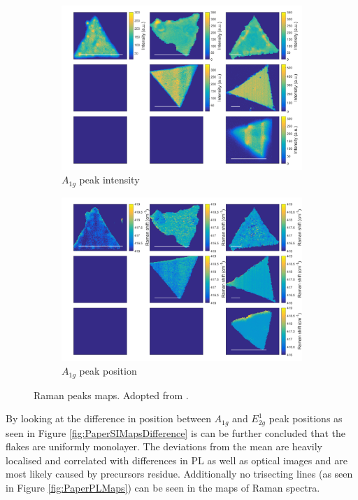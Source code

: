 \begin{figure}[h]
\begin{center}
\begin{subfigure}[b]{0.4\textwidth}
			\includegraphics[width=\textwidth]{PaperSIMapsIntensityA.png}
			\caption{$A_{1g}$ peak intensity}
			\label{fig:PaperSIMapsIntensityA}
		\end{subfigure}
		\quad
		\begin{subfigure}[b]{0.4\textwidth}
			\includegraphics[width=\textwidth]{PaperSIMapsPositionA.png}
			\caption{$A_{1g}$ peak position}
			\label{fig:PaperSIMapsPositionA}
		\end{subfigure}
		\caption{Raman peaks maps. Adopted from \cite{Reale2017}.}
		\label{fig:PaperSIMapsRaman}
	\end{center}
\end{figure}

By looking at the difference in position between $A_{1g}$ and $E^1_{2g}$ peak positions as seen in Figure \ref{fig:PaperSIMapsDifference} is can be further concluded that the flakes are uniformly monolayer. The deviations from the mean are heavily localised and correlated with differences in PL as well as optical images and are most likely caused by precursors residue. Additionally no trisecting lines (as seen in Figure \ref{fig:PaperPLMaps}) can be seen in the maps of Raman spectra.


